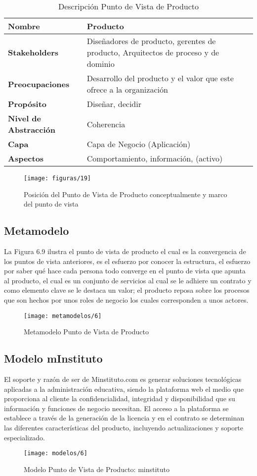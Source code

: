   \begin{table}[H]
  	\centering
  	\begin{tabular}{lp{8cm}}
  		\toprule
  		\textbf{Nombre} & \textbf{Producto} \\
  		\midrule
  		\textbf{Stakeholders} & Diseñadores de producto, gerentes de producto, Arquitectos de proceso y de dominio \\
  		\textbf{Preocupaciones} & Desarrollo del producto y el valor que este ofrece a la organización \\
  		\textbf{Propósito} & Diseñar, decidir \\
  		\textbf{Nivel de Abstracción} & Coherencia \\
  		\textbf{Capa} & Capa de Negocio (Aplicación) \\
  		\textbf{Aspectos} & Comportamiento, información, (activo) \\
  		\bottomrule
  	\end{tabular}
	\captionsetup{width=.95\textwidth}
	\caption{Descripción Punto de Vista de Producto}
	\label{tabla9}
  \end{table}

  \begin{figure}[H]
	\centering
	\texttt{[image: figuras/19]}
	\captionsetup{width=.95\textwidth}
	\caption{Posición del Punto de Vista de Producto conceptualmente y marco del punto de vista}
	\label{figura19}
  \end{figure}
  
  \subsection{Metamodelo}
  La Figura 6.9 ilustra el punto de vista de producto el cual es la convergencia de los puntos de vista anteriores, es el esfuerzo por conocer la estructura, el esfuerzo por saber qué hace cada persona todo converge en el punto de vista que apunta al producto, el cual es un conjunto de servicios al cual se le adhiere un contrato y como elemento clave se le destaca un valor; el producto reposa sobre los procesos que son hechos por unos roles de negocio los cuales corresponden a unos actores.

  \begin{figure}[H]
	\centering
	\texttt{[image: metamodelos/6]}
	\captionsetup{width=.95\textwidth}
	\caption{Metamodelo Punto de Vista de Producto}
	\label{metamodelo6}
  \end{figure}

  \subsection{Modelo mInstituto}
  El soporte y razón de ser de Minstituto.com es generar soluciones tecnológicas aplicadas a la administración educativa, siendo la plataforma web el medio que proporciona al cliente la confidencialidad, integridad y disponibilidad que su información y funciones de negocio necesitan.  El acceso a la plataforma se establece a través de la generación de la licencia y en el contrato se determinan las diferentes características del producto, incluyendo actualizaciones y soporte especializado.

  \begin{figure}[H]
	\centering
	\texttt{[image: modelos/6]}
	\captionsetup{width=.95\textwidth}
	\caption{Modelo Punto de Vista de Producto: minstituto}
	\label{modelo6}
  \end{figure}